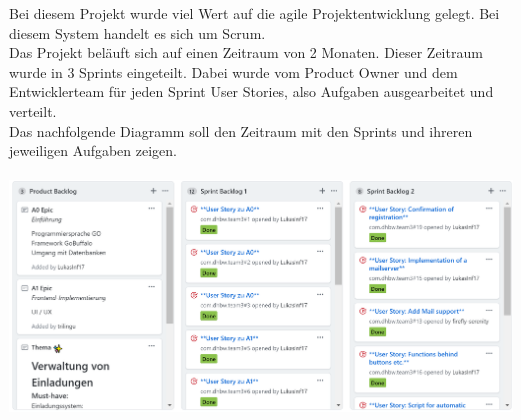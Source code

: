 \documentclass[landscape,a0paper,fontscale=0.285]{baposter} %
\begin{document}
\begin{poster}
{Bei diesem Projekt wurde viel Wert auf die agile Projektentwicklung gelegt. Bei diesem System handelt es sich um Scrum.\\
Das Projekt beläuft sich auf einen Zeitraum von 2 Monaten. Dieser Zeitraum wurde in 3 Sprints eingeteilt. Dabei wurde vom Product Owner und dem Entwicklerteam für jeden Sprint User Stories, also Aufgaben ausgearbeitet und verteilt.\\
Das nachfolgende Diagramm soll den Zeitraum mit den Sprints und ihreren jeweiligen Aufgaben zeigen.\\
\\
\includegraphics[width=1.0\linewidth]{Scrum_Board_GitHub2.PNG}
}






\end{poster}
\end{document}
